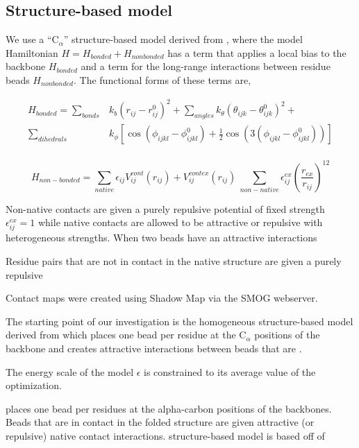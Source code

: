 \documentclass[preprint]{elsarticle}
\begin{document}
\subsection{Structure-based model}
     
    We use a ``C$_{\alpha}$'' structure-based model derived from
\cite{Clementi2000}, where the model Hamiltonian $H = H_{bonded} +
H_{nonbonded}$ has a term that applies a local bias to the backbone
$H_{bonded}$ and a term for the long-range interactions between residue beads
$H_{nonbonded}$. The functional forms of these terms are,

\begin{align}
    H_{bonded} = \sum\limits_{bonds} &k_b (r_{ij} - r_{ij}^0)^2 + \sum\limits_{angles} k_{\theta} (\theta_{ijk} - \theta_{ijk}^0)^2 + \\
        \sum\limits_{dihedrals} &k_{\phi} [ \cos(\phi_{ijkl} - \phi_{ijkl}^0) + \frac{1}{2}\cos(3(\phi_{ijkl} - \phi_{ijkl}^0))] \\
\end{align}

\begin{equation}
    H_{non-bonded} = \sum\limits_{native} \epsilon_{ij}V^{cont}_{ij}(r_{ij}) + V^{cont ex}_{ij}(r_{ij}) \
        \sum\limits_{non-native} \epsilon^{ex}_{ij}\left(\frac{r_{ex}}{r_{ij}}\right)^{12}
\end{equation}


    Non-native contacts are given a purely repulsive potential of fixed
strength $\epsilon^{ex}_{ij} = 1$ while native contacts are allowed to be
attractive or repulsive with heterogeneous strengths. When two beads have an 
attractive interactions

Residue pairs that are not in contact in the native structure are given a purely 
repulsive 

 Contact maps were created using Shadow Map\cite{Noel2012} via the SMOG
webserver\cite{Noel2010}. 

    The starting point of our investigation is the homogeneous structure-based
model derived from \cite{Clementi200} which places one bead per residue at the
C$_{\alpha}$ positions of the backbone and creates attractive interactions 
between beads that are . 

    The energy scale of the model $\epsilon$ is constrained to its average
value of the optimization.


places one bead per residues at the alpha-carbon positions of the backbones. Beads that are in contact 
in the folded structure are given attractive (or repulsive) native contact interactions. structure-based model is based off of 
\end{document}
